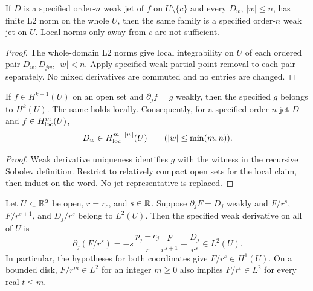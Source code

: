 \begin{lemma}
\label{lem:weak-jet-point-removal}
\leanok
If $D$ is a specified order-$n$ weak jet of $f$ on $U\setminus\{c\}$ and
every $D_w$, $|w|\le n$, has finite L2 norm on the whole $U$, then the
same family is a specified order-$n$ weak jet on $U$.
Local norms only away from $c$ are not sufficient.
\end{lemma}

\begin{proof}
\leanok
The whole-domain L2 norms give local integrability on $U$ of each ordered
pair $D_w,D_{jw}$, $|w|<n$. Apply specified weak-partial point removal to each
pair separately. No mixed derivatives are commuted and no entries are changed.
\end{proof}

\begin{lemma}
\label{lem:weak-jet-regularity}
\leanok
If $f\in H^{k+1}(U)$ on an open set and $\partial_jf=g$ weakly,
then the specified $g$ belongs to $H^k(U)$.
The same holds locally. Consequently, for a specified order-$n$ jet $D$
and $f\in H^m_{\rm loc}(U)$,
\[
 D_w\in H^{m-|w|}_{\rm loc}(U)\qquad (|w|\le \min(m,n)).
\]
\end{lemma}

\begin{proof}
\leanok
Weak derivative uniqueness identifies $g$ with the witness in the recursive
Sobolev definition. Restrict to relatively compact open sets for the local
claim, then induct on the word. No jet representative is replaced.
\end{proof}

\begin{lemma}
\label{lem:radial-weak-multiplier}
\leanok
Let $U\subset\mathbb{R}^2$ be open, $r=r_c$, and $s\in\mathbb{R}$.
Suppose $\partial_jF=D_j$ weakly and
$F/r^s$, $F/r^{s+1}$, and $D_j/r^s$ belong to $L^2(U)$.
Then the specified weak derivative on all of $U$ is
\[
 \partial_j(F/r^s)=
 -s\,\frac{p_j-c_j}{r}\frac{F}{r^{s+1}}+\frac{D_j}{r^s}\in L^2(U).
\]
In particular, the hypotheses for both coordinates give $F/r^s\in H^1(U)$.
On a bounded disk, $F/r^m\in L^2$ for an integer $m\ge0$ also implies
$F/r^t\in L^2$ for every real $t\le m$.
\end{lemma}

